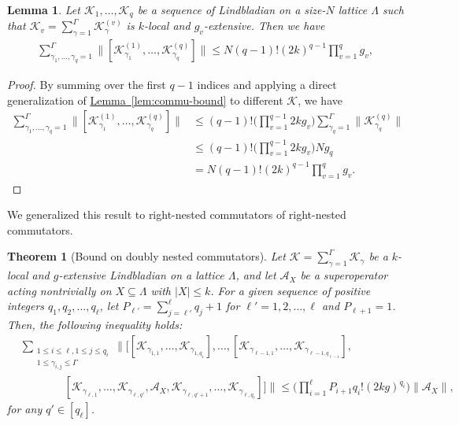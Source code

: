 \documentclass[11pt]{article}
\newtheorem{theorem}{Theorem}
\newtheorem{lemma}{Lemma}
\newcommand{\lem}[1]{\hyperref[lem:#1]{Lemma~\ref*{lem:#1}}}
\newcommand{\mc}{\mathcal}
\begin{document}
\begin{lemma}
\label{lem:commu-bound-sum}
    Let $\mc K_1, \ldots, \mc K_q$ be a sequence of Lindbladian on a size-$N$ lattice $\Lambda$ such that $\mc K_v = \sum_{\gamma=1}^{\Gamma} \mc K_{\gamma}^{(v)}$ is $k$-local and $g_v$-extensive. Then we have 
    \begin{align*}
        \sum_{\gamma_1, \ldots, \gamma_q=1}^{\Gamma} \big\|[\mc K_{\gamma_1}^{(1)}, \ldots, \mc K_{\gamma_q}^{(q)}]\big\|  \le N(q-1)!(2k)^{q-1}\prod_{v=1}^q g_v,
    \end{align*}
\end{lemma}
\begin{proof}
    By summing over the first $q-1$ indices and applying a direct generalization of \lem{commu-bound} to different $\mc K$, we have
    \begin{align*}
        \sum_{\gamma_1, \ldots, \gamma_q=1}^{\Gamma} \big\|[\mc K_{\gamma_1}^{(1)}, \ldots, \mc K_{\gamma_q}^{(q)}]\big\| & \le  (q-1)! \Big(\prod_{v=1}^{q-1} 2kg_v\Big) \sum_{\gamma_q=1}^{\Gamma}\|\mc K_{\gamma_q}^{(q)}\|\\
        &\le (q-1)!\Big(\prod_{v=1}^{q-1} 2k g_v\Big)  Ng_q \\
        &=N(q-1)!(2k)^{q-1}\prod_{v=1}^q g_v.
    \end{align*}
    
\end{proof}
We generalized this result to right-nested commutators of right-nested commutators.
\begin{theorem}[Bound on doubly nested commutators]\label{thm:doubly-nested-bound}
    Let $\mathcal{K} = \sum_{\gamma=1}^{\Gamma} \mathcal{K}_{\gamma}$ be a $k$-local and $g$-extensive Lindbladian on a lattice $\Lambda$, and let $\mathcal{A}_X$ be a superoperator acting nontrivially on $X\subseteq \Lambda$ with $|X|\le k$. For a given sequence of positive integers $q_1, q_2, \ldots, q_\ell$, let $P_{\ell'} = \sum_{j=\ell'}^{\ell} q_j+1$ for $\ell'=1, 2, \ldots, \ell$ and $P_{\ell+1}=1$. Then, the following inequality holds:
    \begin{align*}
        &\sum_{\substack{1 \le i \le \ell,1 \le j \le q_i \\ 1 \le \gamma_{i,j} \le \Gamma}} \bigg\| \Big[ [\mathcal{K}_{\gamma_{1,1}}, \ldots, \mathcal{K}_{\gamma_{1, q_1}}], \ldots, [\mathcal{K}_{\gamma_{\ell-1,1}}, \ldots, \mathcal{K}_{\gamma_{\ell-1, q_{\ell-1}}}], \\
        &\qquad\qquad [\mathcal{K}_{\gamma_{\ell,1}}, \ldots, \mathcal{K}_{\gamma_{\ell, q'}}, \mathcal{A}_X, \mathcal{K}_{\gamma_{\ell, q'+1}}, \ldots, \mathcal{K}_{\gamma_{\ell, q_\ell}}] \Big] \bigg\| \le \bigg(\prod_{i=1}^{\ell}P_{i+1} q_i!(2kg)^{q_i}\bigg)\|\mc A_X\|,
    \end{align*}
    for any $q' \in [q_\ell]$.
\end{theorem}
\end{document}
